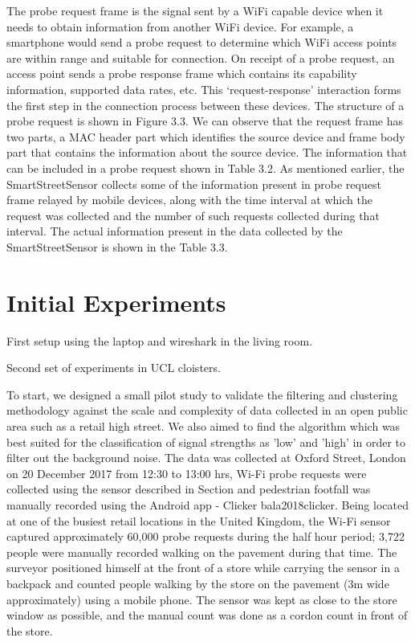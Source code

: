 The probe request frame is the signal sent by a WiFi capable device when it needs to obtain information from another WiFi device.
For example, a smartphone would send a probe request to determine which WiFi access points are within range and suitable for connection.
On receipt of a probe request, an access point sends a probe response frame which contains its capability information, supported data rates, etc.
This ‘request-response’ interaction forms the first step in the connection process between these devices.
The structure of a probe request is shown in Figure 3.3.
We can observe that the request frame has two parts, a MAC header part which identifies the source device and frame body part that contains the information about the source device.
The information that can be included in a probe request shown in Table 3.2.
As mentioned earlier, the SmartStreetSensor collects some of the information present in probe request frame relayed by mobile devices, along with the time interval at which the request was collected and the number of such requests collected during that interval.
The actual information present in the data collected by the SmartStreetSensor is shown in the Table 3.3.

\section{Initial Experiments}

First setup using the laptop and wireshark in the living room.

Second set of experiments in UCL cloisters.

To start, we designed a small pilot study to validate the filtering and clustering methodology against the scale and complexity of data collected in an open public area such as a retail high street.
We also aimed to find the algorithm which was best suited for the classification of signal strengths as 'low' and 'high' in order to filter out the background noise.
The data was collected at Oxford Street, London on 20 December 2017 from 12:30 to 13:00 hrs, Wi-Fi probe requests were collected using the sensor described in Section and pedestrian footfall was manually recorded using the Android app - Clicker bala2018clicker.
Being located at one of the busiest retail locations in the United Kingdom, the Wi-Fi sensor captured approximately 60,000 probe requests during the half hour period; 3,722 people were manually recorded walking on the pavement during that time.
The surveyor positioned himself at the front of a store while carrying the sensor in a backpack and counted people walking by the store on the pavement (3m wide approximately) using a mobile phone.
The sensor was kept as close to the store window as possible, and the manual count was done as a cordon count in front of the store.

